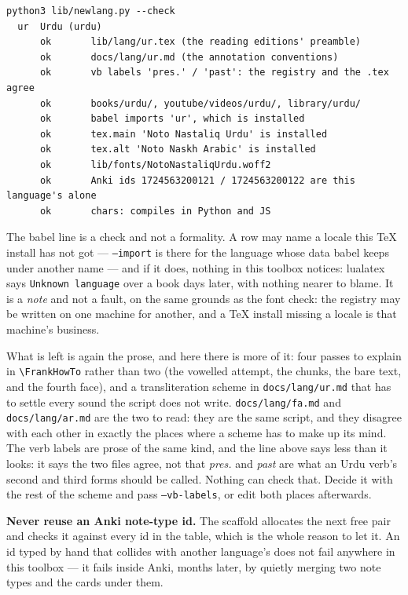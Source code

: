 \documentclass[11pt,oneside]{report}
\newcommand{\file}[1]{\texttt{#1}}
\begin{document}
\begin{lstlisting}
python3 lib/newlang.py --check
  ur  Urdu (urdu)
      ok       lib/lang/ur.tex (the reading editions' preamble)
      ok       docs/lang/ur.md (the annotation conventions)
      ok       vb labels 'pres.' / 'past': the registry and the .tex agree
      ok       books/urdu/, youtube/videos/urdu/, library/urdu/
      ok       babel imports 'ur', which is installed
      ok       tex.main 'Noto Nastaliq Urdu' is installed
      ok       tex.alt 'Noto Naskh Arabic' is installed
      ok       lib/fonts/NotoNastaliqUrdu.woff2
      ok       Anki ids 1724563200121 / 1724563200122 are this language's alone
      ok       chars: compiles in Python and JS
\end{lstlisting}

\noindent The babel line is a check and not a formality. A row may name a
locale this TeX install has not got --- \texttt{--import} is there for the
language whose data babel keeps under another name --- and if it does,
nothing in this toolbox notices: lualatex says \texttt{Unknown language} over
a book days later, with nothing nearer to blame. It is a \emph{note} and not
a fault, on the same grounds as the font check: the registry may be written
on one machine for another, and a TeX install missing a locale is that
machine's business.

What is left is again the prose, and here there is more of it: four
passes to explain in \texttt{\textbackslash FrankHowTo} rather than two (the
vowelled attempt, the chunks, the bare text, and the fourth face), and a
transliteration scheme in \file{docs/lang/ur.md} that has to settle every
sound the script does not write. \file{docs/lang/fa.md} and
\file{docs/lang/ar.md} are the two to read: they are the same script, and they
disagree with each other in exactly the places where a scheme has to make up
its mind. The verb labels are prose of the same kind, and the line above says
less than it looks: it says the two files agree, not that \emph{pres.} and
\emph{past} are what an Urdu verb's second and third forms should be called.
Nothing can check that. Decide it with the rest of the scheme and pass
\texttt{--vb-labels}, or edit both places afterwards.

\begin{badbox}
\textbf{Never reuse an Anki note-type id.} The scaffold allocates the next
free pair and checks it against every id in the table, which is the whole
reason to let it. An id typed by hand that collides with another language's
does not fail anywhere in this toolbox --- it fails inside Anki, months later,
by quietly merging two note types and the cards under them.
\end{badbox}
\end{document}
